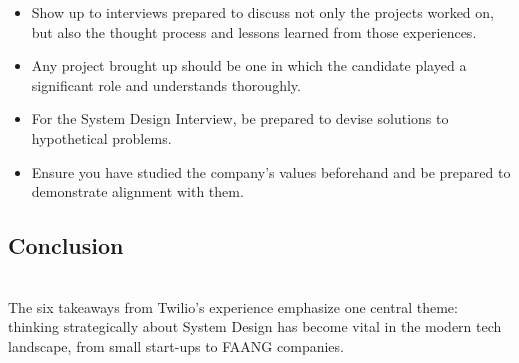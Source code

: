 \begin{itemize}
\item
\protect{}\label{eGMuuSbej9HKp5Rs-hgFr}
Show up to interviews prepared to discuss not only the projects worked on, but also the thought process and lessons learned from those experiences.
\item
\protect{}\label{p8ggu0gSVIZlMCQjOS9tU}
Any project brought up should be one in which the candidate played a significant role and understands thoroughly.
\item
\protect{}\label{0ZArflMnw9WGKGxP727Fq}
For the System Design Interview, be prepared to devise solutions to hypothetical problems.
\item
\protect{}\label{aG9eZJFDsQNKxtfxWYdUp}
Ensure you have studied the company's values beforehand and be prepared to demonstrate alignment with them.
\end{itemize}

\subsection{Conclusion}\label{jGnaUxQ8pBHaaeGi-rNYj}
\\
The six takeaways from Twilio's experience emphasize one central theme: thinking strategically about System Design has become vital in the modern tech landscape, from small start-ups to FAANG companies.

